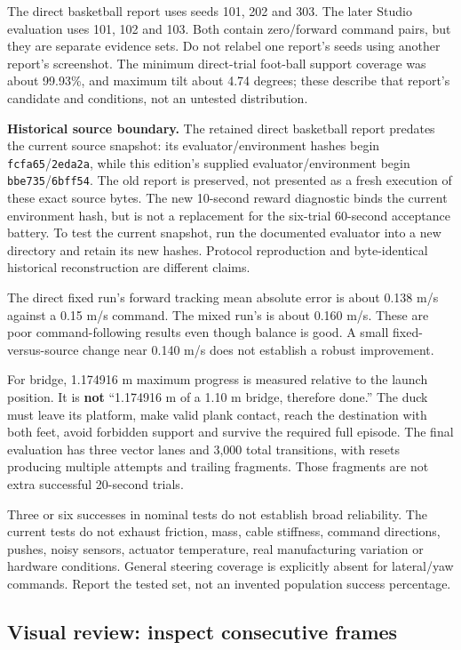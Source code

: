 \documentclass[
  american,
  11pt,
  letterpaper,
]{article}
\begin{document}
The direct basketball report uses seeds 101, 202 and 303. The later
Studio evaluation uses 101, 102 and 103. Both contain zero/forward
command pairs, but they are separate evidence sets. Do not relabel one
report's seeds using another report's screenshot. The minimum
direct-trial foot-ball support coverage was about 99.93\%, and maximum
tilt about 4.74 degrees; these describe that report's candidate and
conditions, not an untested distribution.

\textbf{Historical source boundary.} The retained direct basketball
report predates the current source snapshot: its evaluator/environment
hashes begin \texttt{fcfa65}/\texttt{2eda2a}, while this edition's
supplied evaluator/environment begin \texttt{bbe735}/\texttt{6bff54}.
The old report is preserved, not presented as a fresh execution of these
exact source bytes. The new 10-second reward diagnostic binds the
current environment hash, but is not a replacement for the six-trial
60-second acceptance battery. To test the current snapshot, run the
documented evaluator into a new directory and retain its new hashes.
Protocol reproduction and byte-identical historical reconstruction are
different claims.

The direct fixed run's forward tracking mean absolute error is about
0.138 m/s against a 0.15 m/s command. The mixed run's is about 0.160
m/s. These are poor command-following results even though balance is
good. A small fixed-versus-source change near 0.140 m/s does not
establish a robust improvement.

For bridge, 1.174916 m maximum progress is measured relative to the
launch position. It is \textbf{not} ``1.174916 m of a 1.10 m bridge,
therefore done.'' The duck must leave its platform, make valid plank
contact, reach the destination with both feet, avoid forbidden support
and survive the required full episode. The final evaluation has three
vector lanes and 3,000 total transitions, with resets producing multiple
attempts and trailing fragments. Those fragments are not extra
successful 20-second trials.

Three or six successes in nominal tests do not establish broad
reliability. The current tests do not exhaust friction, mass, cable
stiffness, command directions, pushes, noisy sensors, actuator
temperature, real manufacturing variation or hardware conditions.
General steering coverage is explicitly absent for lateral/yaw commands.
Report the tested set, not an invented population success percentage.

\subsection{Visual review: inspect consecutive
frames}\label{visual-review-inspect-consecutive-frames}
\end{document}
